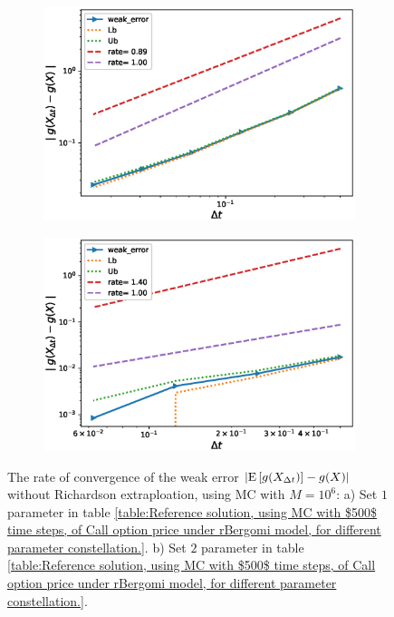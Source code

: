 \FloatBarrier
\begin{figure}[h!]
	\centering
	\begin{subfigure}{.35\textwidth}
		\centering
		\includegraphics[width=1\linewidth]{./figures/rBergomi_weak_error_rates/without_richardson/H_007/weak_convergence_order_Bergomi_H_007_K_1_M_10_6_CI_relative}
		\caption{}
		\label{fig:sub3}
	\end{subfigure}%
	\begin{subfigure}{.35\textwidth}
		\centering
		\includegraphics[width=1\linewidth]{./figures/rBergomi_weak_error_rates/without_richardson/H_002/weak_convergence_order_Bergomi_H_002_K_1_M_3_10_6_CI_relative}
		\caption{}
		\label{fig:sub4}
	\end{subfigure}
	
	\caption{The rate of convergence of the weak error  $\left\lvert\mathrm{E}\left[g(X_{\Delta t})\right]-g(X)\right\rvert$  without Richardson extraploation, using MC with $M=10^6$: a) Set $1$ parameter in table \ref{table:Reference solution, using MC with $500$ time steps, of Call option price under rBergomi model, for different parameter constellation.}.  b) Set $2$ parameter in table \ref{table:Reference solution, using MC with $500$ time steps, of Call option price under rBergomi model, for different parameter constellation.}.}
	\label{fig:Weak_rate_set1_set_2_without_rich}
\end{figure}


